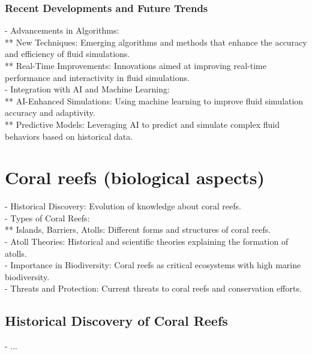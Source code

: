\subsubsection{Recent Developments and Future Trends}
- Advancements in Algorithms: \\
** New Techniques: Emerging algorithms and methods that enhance the accuracy and efficiency of fluid simulations. \\
** Real-Time Improvements: Innovations aimed at improving real-time performance and interactivity in fluid simulations. \\
- Integration with AI and Machine Learning: \\
** AI-Enhanced Simulations: Using machine learning to improve fluid simulation accuracy and adaptivity. \\
** Predictive Models: Leveraging AI to predict and simulate complex fluid behaviors based on historical data. 


\section{Coral reefs (biological aspects)}
\label{sec:state-of-the-art_biology}
- Historical Discovery: Evolution of knowledge about coral reefs. \\
- Types of Coral Reefs: \\
** Islands, Barriers, Atolls: Different forms and structures of coral reefs. \\
- Atoll Theories: Historical and scientific theories explaining the formation of atolls. \\
- Importance in Biodiversity: Coral reefs as critical ecosystems with high marine biodiversity. \\
- Threats and Protection: Current threats to coral reefs and conservation efforts.

\subsection{Historical Discovery of Coral Reefs}
- ... 
